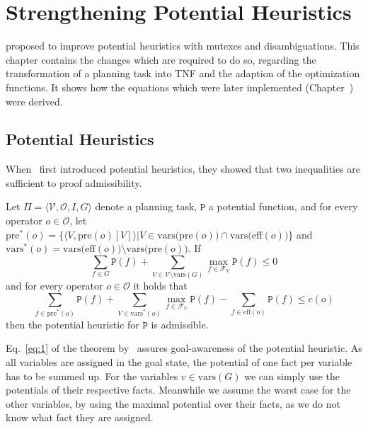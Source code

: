 
\chapter{Strengthening Potential Heuristics}\label{ch:strengthening-potential-heuristics}

\citeauthor{fivser2020strengthening} proposed to improve potential heuristics with mutexes and disambiguations.
This chapter contains the changes which are required to do so, regarding the transformation of a planning task into TNF and the adaption of the optimization functions.
It shows how the equations which were later implemented (Chapter~) were derived.

\section{Potential Heuristics}\label{sec:potential-heuristics}

When~\citeauthor{pommerening2015non} first introduced potential heuristics, they showed that two inequalities are sufficient to proof admissibility.

\begin{theorem}
    \label{theorem:theorem 5} %
    Let $\Pi = \langle \mathcal{V}, \mathcal{O}, I, G \rangle$ denote a planning task, $\mathtt{P}$ a
    potential function, and for every operator $o\in\mathcal{O}$, let
    $\mathrm{pre}^*(o)=\{\langle V, \mathrm{pre}(o)[V]\rangle |V\in \mathrm{vars(pre}(o))\cap\mathrm{vars(eff}(o))\}$ and
    $\mathrm{vars}^*(o)=\mathrm{vars(eff}(o))\setminus\mathrm{vars(pre}(o))$. If
    \[\sum_{f\in G}\mathtt{P}(f)+\sum_{V\in\mathcal{V}\setminus\mathrm{vars}(G)}\max_{f\in\mathcal{F}_V}\mathtt{P}(f)\leq0\label{eq:1}\tag{1}\]
    and for every operator $o\in\mathcal{O}$ it holds that
    \[\sum_{f\in\mathrm{pre}^*(o)}\mathtt{P}(f)+\sum_{V\in\mathrm{vars}^*(o)}\max_{f\in\mathcal{F}_V}\mathtt{P}(f)-\sum_{f\in\mathrm{eff}(o)}\mathtt{P}(f)\leq c(o)\label{eq:2}\tag{2}\]
    then the potential heuristic for $\mathtt{P}$ is admissible.
\end{theorem}


Eq.~\eqref{eq:1} of the theorem by~\citeauthor{fivser2020strengthening} assures goal-awareness of the potential heuristic.
As all variables are assigned in the goal state, the potential of one fact per variable has to be summed up.
For the variables $v\in\text{vars}(G)$ we can simply use the potentials of their respective facts.
Meanwhile we assume the worst case for the other variables, by using the maximal potential over their facts, as we do not know what fact they are assigned.

